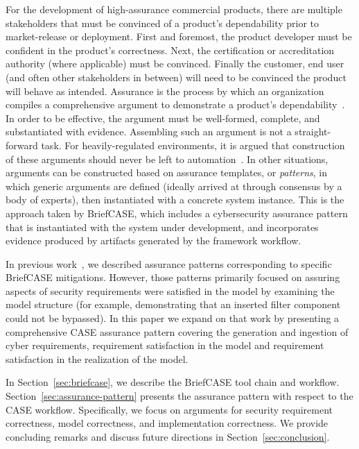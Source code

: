 For the development of high-assurance commercial products, there are multiple stakeholders that must be convinced of a product's dependability prior to market-release or deployment.  First and foremost, the product developer must be confident in the product's correctness.  Next, the certification or accreditation authority (where applicable) must be convinced.  Finally the customer, end user (and often other stakeholders in between) will need to be convinced the product will behave as intended.  Assurance is the process by which an organization compiles a comprehensive argument to demonstrate a product's dependability~\cite{???}.  In order to be effective, the argument must be well-formed, complete, and substantiated with evidence.  Assembling such an argument is not a straight-forward task.  For heavily-regulated environments, it is argued that construction of these arguments should never be left to automation~\cite{???-Holloway}.  In other situations, arguments can be constructed based on assurance templates, or \textit{patterns}, in which generic arguments are defined (ideally arrived at through consensus by a body of experts), then instantiated with a concrete system instance.  This is the approach taken by BriefCASE, which includes a cybersecurity assurance pattern that is instantiated with the system under development, and incorporates evidence produced by artifacts generated by the framework workflow.


In previous work~\cite{resolute-destion}, we described assurance patterns corresponding to specific BriefCASE mitigations.  However, those patterns primarily focused on assuring aspects of security requirements were satisfied in the model by examining the model structure (for example, demonstrating that an inserted filter component could not be bypassed).  
%
In this paper we expand on that work by presenting a comprehensive CASE assurance pattern covering the generation and ingestion of cyber requirements, requirement satisfaction in the model and requirement satisfaction in the realization of the model.  

In Section~\ref{sec:briefcase}, we describe the BriefCASE tool chain and workflow. Section~\ref{sec:assurance-pattern} presents the assurance pattern with respect to the CASE workflow. Specifically, we focus on arguments for security requirement correctness, model correctness, and implementation correctness.  We provide concluding remarks and discuss future directions in Section~\ref{sec:conclusion}.